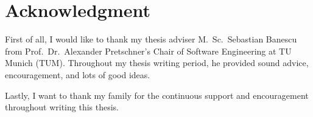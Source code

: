 \newpage
\thispagestyle{empty}
\section*{Acknowledgment}
First of all, I would like to thank my thesis adviser M.~Sc.~Sebastian Banescu from Prof.~Dr.~Alexander Pretschner's Chair of Software Engineering at TU Munich (TUM). Throughout my thesis writing period, he provided sound advice, encouragement, and lots of good ideas.

\bigskip

Lastly, I want to thank my family for the continuous support and encouragement throughout writing this thesis.